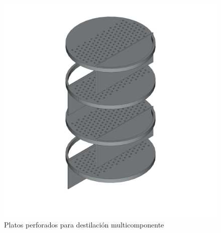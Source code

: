 \begin{figure}[ht]
    \centering
    \includegraphics[width=1\linewidth]{../../desings/platos.png}
    \caption{Platos perforados para destilación multicomponente}
    \label{fig:plato}
\end{figure}
\vspace*{\fill}
